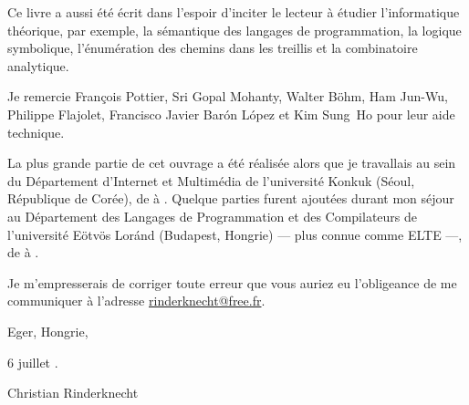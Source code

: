 Ce livre a aussi été écrit dans l'espoir d'inciter le lecteur à
étudier l'informatique théorique, par exemple, la sémantique des
langages de programmation, la logique symbolique, l'énumération des
chemins dans les treillis et la combinatoire analytique.

Je remercie Fran\c{c}ois Pottier, Sri Gopal Mohanty, Walter B\"ohm,
Ham Jun-Wu, Philippe Flajolet, Francisco Javier Bar\'on L\'opez et\!
Kim Sung~Ho pour leur aide technique.

La plus grande partie de cet ouvrage a été réalisée alors que je
travallais au sein du Département d'Internet et Multimédia de
l'université Konkuk (Séoul, République de Corée), de
 à . Quelque parties furent
ajoutées durant mon séjour au Département des Langages de
Programmation et des Compilateurs de l'université E\"otv\"os Lor\'and
(Budapest, Hongrie) --- plus connue comme ELTE ---, de
 à .

Je m'empresserais de corriger toute erreur que vous auriez eu
l'obligeance de me communiquer à l'adresse \url{rinderknecht@free.fr}.

\bigskip

\hfill{}Eger, Hongrie,

\hfill 6 juillet .

\bigskip

\hfill{}Christian Rinderknecht

